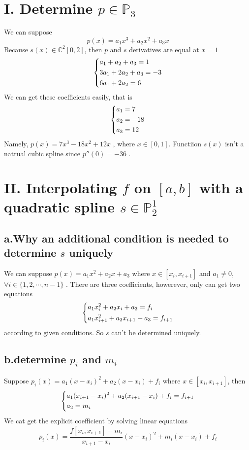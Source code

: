 \documentclass[twoside,a4paper]{article}
\begin{document}
\pagestyle{fancy}
\fancyhead{}


\section*{I. Determine $p \in \mathbb{P}_3$}
We can suppose
\[
p(x)=a_1x^3+a_2x^2+a_3x
\]
Because $s(x)\in \mathbb{C}^2[0,2]$, then $p$ and $s$ derivatives are equal at $x=1$ 
\[
\left\{\begin{lgathered}
a_1+a_2+a_3=1 \\
3a_1+2a_2+a_3=-3\\
6a_1+2a_2=6 \\
\end{lgathered} \right. 
\]
We can get these coefficients easily, that is 
\[
\left\{\begin{lgathered}
a_1=7\\
a_2=-18\\
a_3=12 \\
\end{lgathered} \right. 
\]
Namely, $p(x)=7x^3-18x^2+12x$ , where $x\in[0,1]$. Functiion $s(x)$ isn't a natrual cubic spline since $p''(0)=-36$ .

\section*{II. Interpolating $f$ on $[a,b]$ with a quadratic spline $s\in\mathbb{P}_2^1$}
\subsection*{a.Why an additional condition is needed to determine $s$ uniquely}
We can suppose $p(x)=a_1x^2+a_2x+a_3$ where $x\in[x_i,x_{i+1}]$ and $a_1\neq0$, $\forall i\in\{1,2,\cdots,n-1\}$ . There are three coefficients, howerever, only can get two equations
\[
\left\{
\begin{lgathered}
a_1x_i^2+a_2x_i+a_3=f_i\\
a_1x_{i+1}^2+a_2x_{i+1}+a_3=f_{i+1}
\end{lgathered} 
\right.
\]
according to given conditions. So $s$ can't be determined uniquely.
\subsection*{b.determine $p_i$ and $m_i$}
Suppose $p_i(x)=a_1(x-x_i)^2+a_2(x-x_i)+f_i$ where $x \in [x_i,x_{i+1}]$, then
\[
\left\{
\begin{lgathered}
a_1(x_{i+1}-x_i)^2+a_2(x_{i+1}-x_i)+f_i=f_{i+1}\\
a_2=m_i
\end{lgathered} 
\right.
\]
We cat get the explicit coefficient by solving linear equations
\[
p_i(x)=\frac{f[x_i,x_{i+1}]-m_i}{x_{i+1}-x_i}(x-x_i)^2+m_i(x-x_i)+f_i
\]
\end{document}

